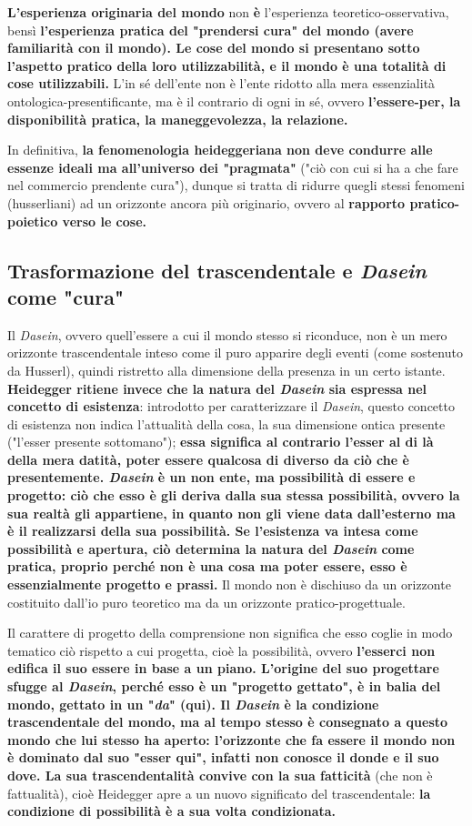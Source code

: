 \textbf{L'esperienza originaria del mondo} non \textbf{è} l'esperienza
teoretico-osservativa, bensì \textbf{l'esperienza pratica del
"prendersi cura" del mondo (avere familiarità con il mondo).
Le cose del mondo si presentano sotto l'aspetto
pratico della loro utilizzabilità, e il mondo è
una totalità di cose utilizzabili.}
L'in sé dell'ente non è l'ente ridotto alla mera
essenzialità ontologica-presentificante, ma è il
contrario di ogni in sé, ovvero \textbf{l'essere-per, la
disponibilità pratica, la maneggevolezza, la relazione.}

In definitiva,\textbf{ la fenomenologia heideggeriana non deve
condurre alle essenze ideali ma all'universo dei
"pragmata"} ("ciò con cui si ha a che fare nel commercio
prendente cura"), dunque si tratta di ridurre
quegli stessi fenomeni (husserliani) ad un
orizzonte ancora più originario, ovvero al
\textbf{rapporto pratico-poietico verso le cose.}

\subsection{Trasformazione del trascendentale e \textit{Dasein} come "cura"}

Il \textit{Dasein}, ovvero quell'essere a cui il mondo stesso si
riconduce, non è un mero orizzonte trascendentale
inteso come il puro apparire degli eventi (come sostenuto da
Husserl), quindi ristretto alla dimensione
della presenza in un certo istante.
\textbf{Heidegger ritiene invece che la natura del \textit{Dasein} sia
espressa nel concetto di esistenza}: introdotto per caratterizzare il \textit{Dasein}, questo concetto
di esistenza non
indica l'attualità della cosa, la sua dimensione ontica
presente ("l'esser presente sottomano"); \textbf{essa significa
al contrario l'esser al di là della mera datità, poter
essere qualcosa di diverso da ciò che è presentemente.
\textit{Dasein} è un non ente, ma possibilità di essere e
progetto: ciò che esso è gli deriva dalla sua stessa
possibilità, ovvero la sua realtà gli appartiene,
in quanto non gli viene data dall'esterno ma è
il realizzarsi della sua possibilità.
Se l'esistenza va intesa come possibilità e apertura,
ciò determina la natura del \textit{Dasein} come pratica,
proprio perché non è una cosa ma poter essere,
esso è essenzialmente progetto e prassi.}
Il mondo non è dischiuso da un orizzonte costituito
dall'io puro teoretico ma da un orizzonte pratico-progettuale.

Il carattere di progetto della comprensione non
significa che esso coglie in modo tematico ciò
rispetto a cui progetta, cioè la possibilità, ovvero
\textbf{l'esserci non edifica il suo essere in base a un
piano. L'origine del suo progettare sfugge al \textit{Dasein},
perché esso è un "progetto gettato", è in balia
del mondo, gettato in un "\textit{da}" (qui).
Il \textit{Dasein} è la condizione trascendentale del mondo,
ma al tempo stesso è consegnato a questo mondo
che lui stesso ha aperto: l'orizzonte che fa essere
il mondo non è dominato dal suo "esser qui", infatti
non conosce il donde e il suo dove. La sua
trascendentalità convive con la sua fatticità} (che non
è fattualità), cioè Heidegger apre a un nuovo
significato del trascendentale: \textbf{la condizione di
possibilità è a sua volta condizionata.}

